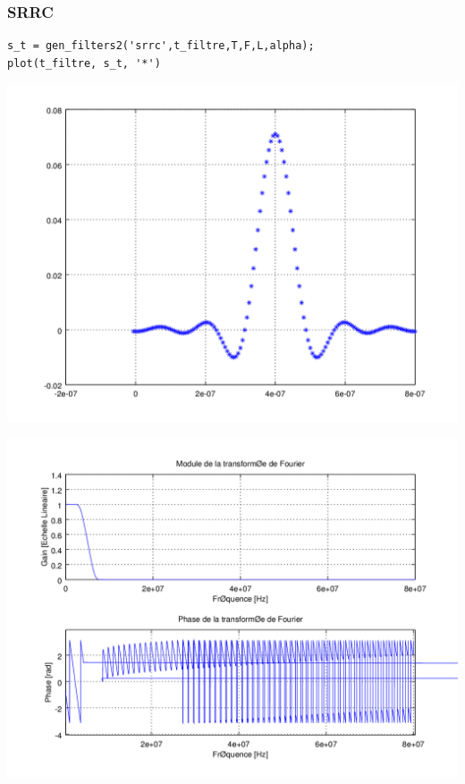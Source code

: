 \documentclass{acm_proc_article-sp}
\begin{document}
\subsubsection{SRRC}

\begin{lstlisting}
s_t = gen_filters2('srrc',t_filtre,T,F,L,alpha);
plot(t_filtre, s_t, '*')
\end{lstlisting}

\begin{center}
\includegraphics[scale=0.45]{SRRC_3.png}
\end{center}

\begin{center}
\includegraphics[scale=0.45]{SRRC_rep_3.png}
\end{center}
\end{document}
